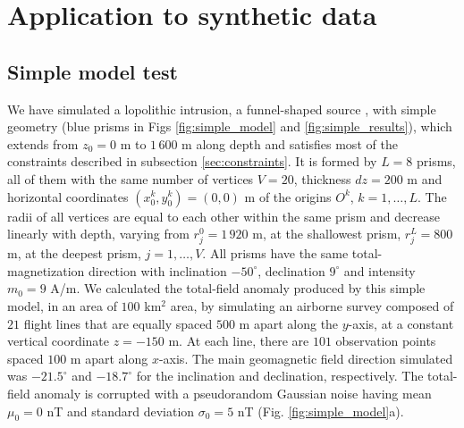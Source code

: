 \section{Application to synthetic data}\label{sec:synthetic}

\subsection{Simple model test}

We have simulated a lopolithic intrusion, a funnel-shaped source \cite[]{cawthorn-2018}, with simple geometry (blue prisms in Figs \ref{fig:simple_model} and \ref{fig:simple_results}), which extends from $z_0=0$ m to $1\,600$ m along depth and satisfies most of the constraints described in subsection \ref{sec:constraints}. It is formed by $L=8$ prisms, all of them with the same number of vertices $ V = 20 $, thickness $ dz = 200 $ m and horizontal coordinates $ (x_0^k, y_0^k) = (0, 0) $ m of the origins $O^k$, $k=1,\dots,L$. The radii of all vertices are equal to each other within the same prism and decrease linearly with depth, varying from $r_j^0=1\,920$ m, at the shallowest prism, $r_j^L=800$ m, at the deepest prism, $j=1,\dots, V$. All prisms have the same total-magnetization direction with inclination $ -50^\circ $, declination $ 9^\circ $ and intensity $ m_0 = 9 $ A/m. We calculated the total-field anomaly produced by this simple model, in an area of $ 100 $ km$^2$ area, by simulating an airborne survey composed of $ 21 $ flight lines that are equally spaced $ 500 $ m apart along the $ y $-axis, at a constant vertical coordinate $ z = -150 $ m. At each line, there are $ 101 $ observation points spaced $100$ m apart along $ x $-axis. 
The main geomagnetic field direction simulated was $ -21.5^\circ $ and $ -18.7^\circ $ for the inclination and declination, respectively. 
The total-field anomaly is corrupted with a pseudorandom Gaussian noise having mean $ \mu_0=0 $ nT and standard deviation $ \sigma_0 = 5 $ nT (Fig. \ref{fig:simple_model}a).


